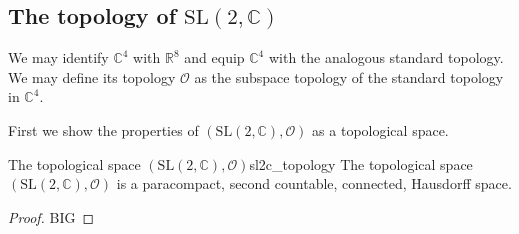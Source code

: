 \subsection{The topology of \texorpdfstring{\(\mathrm{SL}(2,\mathbb{C})\)}{(2,C)}}
We may identify \(\mathbb{C}^4\) with \(\mathbb{R}^8\) and equip \(\mathbb{C}^4\) with the analogous standard topology. We may define its topology \(\mathcal{O}\) as the subspace topology of the standard topology in \(\mathbb{C}^4.\)

First we show the properties of \((\mathrm{SL}(2,\mathbb{C}), \mathcal{O})\) as a topological space.
\begin{proposition}{The topological space \((\mathrm{SL}(2,\mathbb{C}), \mathcal{O})\)}{sl2c_topology}
    The topological space \((\mathrm{SL}(2, \mathbb{C}), \mathcal{O})\) is a paracompact, second countable, connected, Hausdorff space.
\end{proposition}
\begin{proof}
    BIG \todo
\end{proof}

